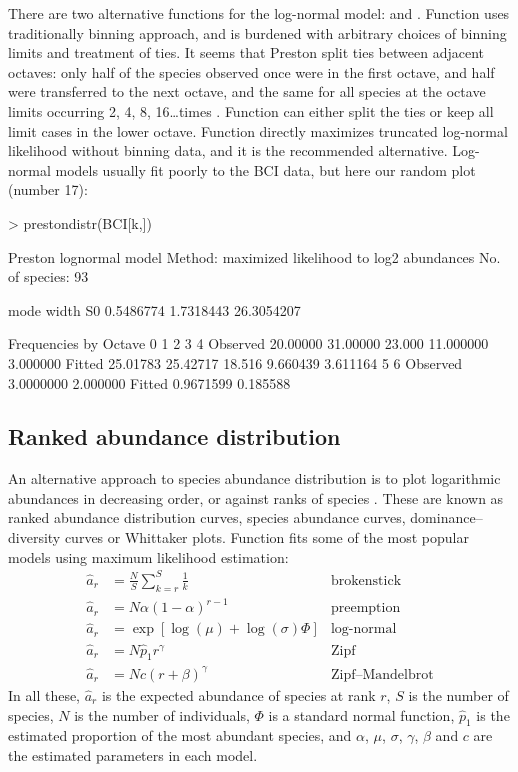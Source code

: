 \documentclass[a4paper,10pt,twocolumn]{article}
\begin{document}
There are two alternative functions for the log-normal model:
 and .  Function 
uses traditionally binning approach, and is burdened with arbitrary
choices of binning limits and treatment of ties. It seems that Preston
split ties between adjacent octaves: only half of the species observed
once were in the first octave, and half were transferred to the next
octave, and the same for all species at the octave limits occurring 2,
4, 8, 16\ldots times \citep{WilliamsonGaston05}. Function
 can either split the ties or keep all limit cases in
the lower octave.  Function  directly maximizes
truncated log-normal likelihood without binning data, and it is the
recommended alternative.  Log-normal models usually fit poorly to the
BCI data, but here our random plot (number 17):
\begin{Schunk}
\begin{Sinput}
> prestondistr(BCI[k,])
\end{Sinput}
\begin{Soutput}
Preston lognormal model
Method: maximized likelihood to log2 abundances 
No. of species: 93 

      mode      width         S0 
 0.5486774  1.7318443 26.3054207 

Frequencies by Octave
                0        1      2         3        4
Observed 20.00000 31.00000 23.000 11.000000 3.000000
Fitted   25.01783 25.42717 18.516  9.660439 3.611164
                 5        6
Observed 3.0000000 2.000000
Fitted   0.9671599 0.185588
\end{Soutput}
\end{Schunk}

\subsection{Ranked abundance distribution}

An alternative approach to species abundance distribution is to plot
logarithmic abundances in decreasing order, or against ranks of
species \citep{Whittaker65}.  These are known as ranked abundance
distribution curves, species abundance curves, dominance--diversity
curves or Whittaker plots.  Function  fits some of the
most popular models \citep{Bastow91} using maximum likelihood
estimation:
\begin{align}
\hat a_r &= \frac{N}{S} \sum_{k=r}^S \frac{1}{k} &\text{brokenstick}\\
\hat a_r &= N \alpha (1-\alpha)^{r-1} & \text{preemption} \\
\hat a_r &= \exp \left[\log (\mu) + \log (\sigma) \Phi \right]
&\text{log-normal}\\
\hat a_r &= N \hat p_1 r^\gamma &\text{Zipf}\\
\hat a_r &= N c (r + \beta)^\gamma &\text{Zipf--Mandelbrot}
\end{align}
In all these, $\hat a_r$ is the expected abundance of species at rank $r$, $S$
is the number of species, $N$ is the number of individuals, $\Phi$ is
a standard normal function, $\hat p_1$ is the estimated proportion of
the most abundant species, and $\alpha$, $\mu$, $\sigma$, $\gamma$,
$\beta$ and $c$ are the estimated parameters in each model.
\end{document}
